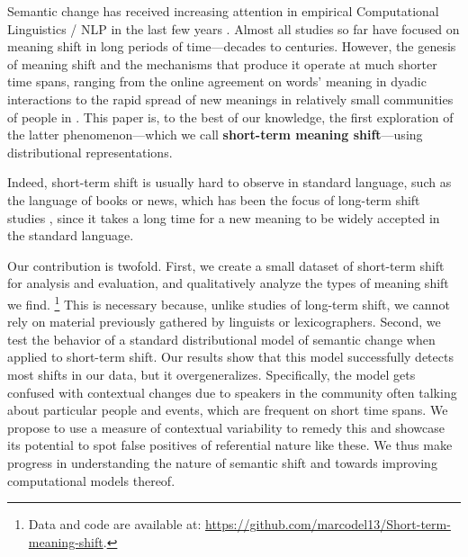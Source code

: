 Semantic change has received increasing attention in empirical Computational Linguistics / NLP in the last few years \cite{tang2018state,KutuzovEtal-coling2018}. Almost all studies so far have focused on meaning shift in long periods of time---decades to centuries. However, the genesis of meaning shift and the mechanisms that produce it operate at much shorter time spans, ranging
from the online agreement on words' meaning in dyadic interactions \cite{brennan1996conceptual} to the rapid spread of new meanings in relatively small communities of people in \cite{wenger1998communities,eckert-mcconnellginet1992}.
This paper is, to the best of our knowledge, the first exploration of the latter phenomenon---which we call \textbf{short-term meaning shift}---using distributional representations.

Indeed, short-term shift is usually hard to observe in standard language, such
as the language of books or news, which has been the focus of
long-term shift studies \cite[e.g.,][]{hamilton2016diachronic,kulkarni2015statistically}, since
it takes a long time for a new meaning to be widely accepted in the standard language. 

Our contribution is twofold. First, we create a small dataset of short-term shift for analysis and evaluation, and qualitatively analyze the types of meaning shift we find.%
\footnote{Data and code are available at: 
\url{https://github.com/marcodel13/Short-term-meaning-shift}.} 
This is necessary because, unlike studies of long-term shift, we cannot rely on material previously gathered by linguists or lexicographers.
Second, we test the behavior of a standard distributional model of semantic change when
 applied to short-term shift. 
Our results show that this model successfully detects most shifts in our data, but it overgeneralizes. Specifically, the model gets confused with contextual changes due to speakers in the community often talking about particular people and events, which are frequent on short time spans. 
We propose to use a measure of contextual variability to remedy this and showcase its potential to spot false positives of referential nature like these.
We thus make progress in understanding the nature of semantic shift and towards improving computational models thereof.

